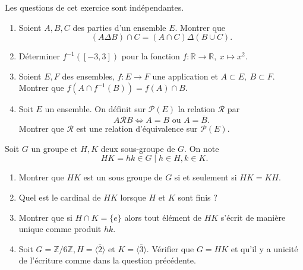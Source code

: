 \begin{exercise}[from=Devoir MPI 2019,nosol]
	Les questions de cet exercice sont indépendantes.
	\begin{enumerate}
		\item Soient $A,B,C$ des parties d'un ensemble $E$. Montrer que
		$$
			(A \Delta B) \cap C=(A \cap C) \Delta(B \cup C).
		$$
		\item Déterminer $f^{-1}([-3,3])$ pour la fonction $f:\mathbb{R}\rightarrow\mathbb{R},\ x \mapsto x^2$.
		\item Soient $E,F$ des ensembles, $f:E \rightarrow F$ une application et $A \subset E,\ B \subset F$.
		Montrer que $f(A \cap f^{-1}(B))=f(A) \cap B$.
		\item Soit $E$ un ensemble. On définit sur $\mathcal{P}(E)$ la relation $\mathcal{R}$ par
		$$
			A \mathcal{R} B \Longleftrightarrow A = B \text{ ou } A = \bar{B}.
		$$
		Montrer que $\mathcal{R}$ est une relation d'équivalence sur $\mathcal{P}(E)$.
	\end{enumerate}
\end{exercise}

\begin{exercise}[from=Devoir MPI 2019,nosol]
	Soit $G$ un groupe et $H,K$ deux sous-groupe de $G$. On note
	$$
		HK=hk \in G \mid h \in H,k \in K.
	$$
	\begin{enumerate}
		\item Montrer que $HK$ est un sous groupe de $G$ si et seulement si $HK=KH$.
		\item Quel est le cardinal de $HK$ lorsque $H$ et $K$ sont finis ?
		\item Montrer que si $H \cap K = \{e\}$ alors tout élément de $HK$ s'écrit de manière unique comme produit $hk$.
		\item Soit $G=\mathbb{Z}/6\mathbb{Z}, H=\langle \bar{2}\rangle \text{ et } K=\langle\bar{3}\rangle$. Vérifier que $G=HK$ et qu'il y a unicité de l'écriture comme dans la question précédente.
	\end{enumerate}
\end{exercise}

